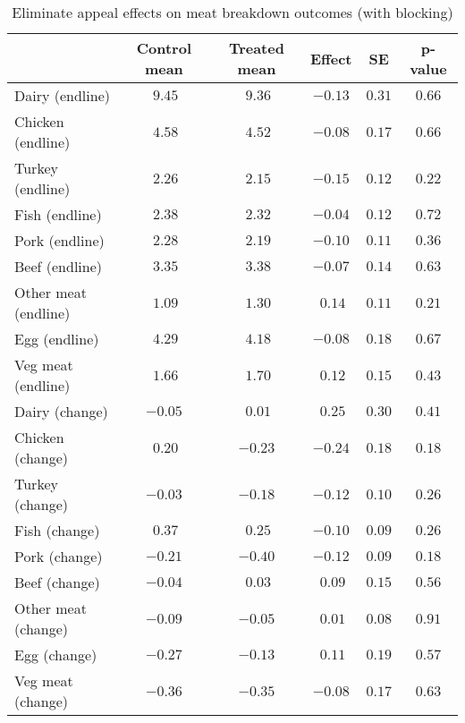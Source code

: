 \begin{table*}[ht]
\caption{Eliminate appeal effects on meat breakdown outcomes (with blocking)\label{round}} 
\begin{center}
\begin{tabular}{lccccc}
\hline\hline
\multicolumn{1}{l}{}&\multicolumn{1}{c}{Control mean}&\multicolumn{1}{c}{Treated mean}&\multicolumn{1}{c}{Effect}&\multicolumn{1}{c}{SE}&\multicolumn{1}{c}{p-value}\tabularnewline
\hline
Dairy (endline)&$~9.45$&$~9.36$&$-0.13$&$0.31$&$0.66$\tabularnewline
Chicken (endline)&$~4.58$&$~4.52$&$-0.08$&$0.17$&$0.66$\tabularnewline
Turkey (endline)&$~2.26$&$~2.15$&$-0.15$&$0.12$&$0.22$\tabularnewline
Fish (endline)&$~2.38$&$~2.32$&$-0.04$&$0.12$&$0.72$\tabularnewline
Pork (endline)&$~2.28$&$~2.19$&$-0.10$&$0.11$&$0.36$\tabularnewline
Beef (endline)&$~3.35$&$~3.38$&$-0.07$&$0.14$&$0.63$\tabularnewline
Other meat (endline)&$~1.09$&$~1.30$&$~0.14$&$0.11$&$0.21$\tabularnewline
Egg (endline)&$~4.29$&$~4.18$&$-0.08$&$0.18$&$0.67$\tabularnewline
Veg meat (endline)&$~1.66$&$~1.70$&$~0.12$&$0.15$&$0.43$\tabularnewline
Dairy (change)&$-0.05$&$~0.01$&$~0.25$&$0.30$&$0.41$\tabularnewline
Chicken (change)&$~0.20$&$-0.23$&$-0.24$&$0.18$&$0.18$\tabularnewline
Turkey (change)&$-0.03$&$-0.18$&$-0.12$&$0.10$&$0.26$\tabularnewline
Fish (change)&$~0.37$&$~0.25$&$-0.10$&$0.09$&$0.26$\tabularnewline
Pork (change)&$-0.21$&$-0.40$&$-0.12$&$0.09$&$0.18$\tabularnewline
Beef (change)&$-0.04$&$~0.03$&$~0.09$&$0.15$&$0.56$\tabularnewline
Other meat (change)&$-0.09$&$-0.05$&$~0.01$&$0.08$&$0.91$\tabularnewline
Egg (change)&$-0.27$&$-0.13$&$~0.11$&$0.19$&$0.57$\tabularnewline
Veg meat (change)&$-0.36$&$-0.35$&$-0.08$&$0.17$&$0.63$\tabularnewline
\hline
\end{tabular}\end{center}

\end{table*}
